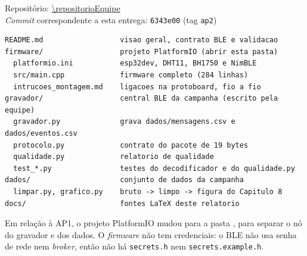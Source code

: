 \noindent Repositório: \url{\repositorioEquipe}\\
\emph{Commit} correspondente a esta entrega:
\texttt{6343e00} (tag \texttt{ap2})

\begin{lstlisting}[style=terminal, caption={Estrutura do repositório na AP2}, label={lst:repo}]
README.md                  visao geral, contrato BLE e validacao
firmware/                  projeto PlatformIO (abrir esta pasta)
  platformio.ini           esp32dev, DHT11, BH1750 e NimBLE
  src/main.cpp             firmware completo (284 linhas)
  intrucoes_montagem.md    ligacoes na protoboard, fio a fio
gravador/                  central BLE da campanha (escrito pela equipe)
  gravador.py              grava dados/mensagens.csv e dados/eventos.csv
  protocolo.py             contrato do pacote de 19 bytes
  qualidade.py             relatorio de qualidade
  test_*.py                testes do decodificador e do qualidade.py
dados/                     conjunto de dados da campanha
  limpar.py, grafico.py    bruto -> limpo -> figura do Capitulo 8
docs/                      fontes LaTeX deste relatorio
\end{lstlisting}

Em relação à AP1, o projeto PlatformIO mudou para a pasta
, para separar o nó do gravador e dos dados. O
\emph{firmware} não tem credenciais: o BLE não usa senha de rede nem
\emph{broker}, então não há \texttt{secrets.h} nem
\texttt{secrets.example.h}.

